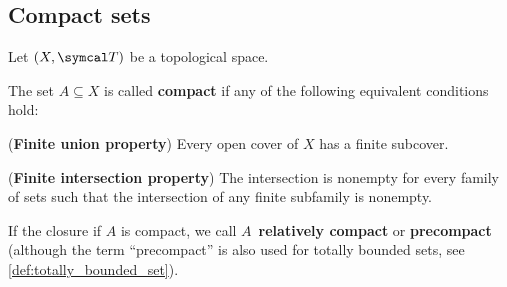 \subsection{Compact sets}\label{sec:compact_sets}

Let \( (X, \Cal{T}) \) be a topological space.

\begin{definition}\label{def:compact_set}\cite[40]{Deimling1985}
  The set \( A \subseteq X \) is called \textbf{compact} if any of the following equivalent conditions hold:
  \begin{defenum}
    \item\label{def:compact_set/union} (\textbf{Finite union property}) Every open cover of \( X \) has a finite subcover.
    \item\label{def:compact_set/intersection} (\textbf{Finite intersection property}) The intersection is nonempty for every family of sets such that the intersection of any finite subfamily is nonempty.
  \end{defenum}

  If the closure if \( A \) is compact, we call \( A \)~\textbf{relatively compact} or \textbf{precompact} (although the term \enquote{precompact} is also used for totally bounded sets, see \ref{def:totally_bounded_set}).
\end{definition}
